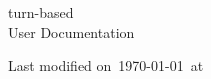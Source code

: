 \documentclass[a4paper,11pt,extrafontsizes,openany,oneside]{memoir}
\begin{document}
\frontmatter

\begin{titlingpage}
    \begin{center}
        \vspace*{50pt}

        {\HUGE\ttfamily turn-based\\[\baselineskip]}
        {\huge User Documentation}

        \vfill

        {\Large Last modified on\ \today\ at\ \printtime}
    \end{center}
\end{titlingpage}

\clearpage
\setcounter{tocdepth}{1}%
\tableofcontents

\clearpage
\listoftables

\mainmatter





\backmatter
\printindex
\end{document}
